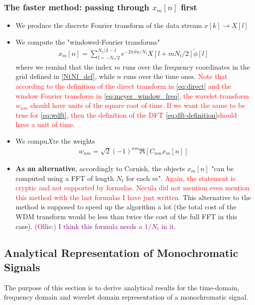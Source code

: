 \documentclass{article}
\begin{document}
\subsubsection{The faster method: passing through $x_m[n]$ first}
\begin{itemize}
    \item We produce the discrete Fourier transform of the data stream $x[k]\to X[l]$
    \item We compute the "windowed-Fourier transforms"
    \begin{align}
    \label{eq:wdft}
        x_m[n]=\sum_{l=-N_t/2}^{N_t/2-1}e^{-2\pi iln/N_t}X[l+mN_t/2]\tilde\phi[l]
    \end{align}
    where we remind that the index $m$ runs over the frequency coordinates in the grid defined in \eqref{NtNf_def}, while $n$ runs over the time ones. \textcolor{red}{Note that according to the definition of the direct transform in \eqref{eq:direct} and the window Fourier transform in \eqref{eq:meyer_window_freq}, the wavelet transform $w_{nm}$ should have units of the square root of time. If we want the same to be true for \eqref{eq:wdft}, then the definition of the DFT \eqref{eq:dft-definition}should have a unit of time.}
    \item We compu$X$te the weights
    \begin{align}
    \label{eq:fast}
        w_{nm}=\sqrt{2}(-1)^{nm}\Re\left[C_{nm}x_m[n]\right]
    \end{align}
    \item \textbf{As an alternative}, accordingly to Cornish, the objects $x_m[n]$ "can be computed using a
    FFT of length $N_t$ for each $m$". \textcolor{red}{Again, the statement is cryptic and not supported by formulas. Necula did not mention even mention this method with the last formulas I have just written.} This alternative to the method is supposed to speed up the algorithm a lot (the total cost of the WDM transform would be less than twice the cost of the full FFT in this case). \textcolor{purple}{(Ollie:) I think this formula needs a $1/N_{t}$ in it. }
\end{itemize}

\subsection{Analytical Representation of Monochromatic Signals}
The purpose of this section is to derive analytical results for the time-domain, frequency domain and wavelet domain representation of a monochromatic signal.
\end{document}
